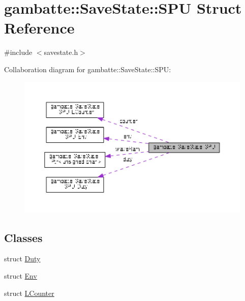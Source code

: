 \hypertarget{structgambatte_1_1SaveState_1_1SPU}{}\section{gambatte\+:\+:Save\+State\+:\+:S\+PU Struct Reference}
\label{structgambatte_1_1SaveState_1_1SPU}


{\ttfamily \#include $<$savestate.\+h$>$}



Collaboration diagram for gambatte\+:\+:Save\+State\+:\+:S\+PU\+:\nopagebreak
\begin{figure}[H]
\begin{center}
\leavevmode
\includegraphics[width=350pt]{structgambatte_1_1SaveState_1_1SPU__coll__graph}
\end{center}
\end{figure}
\subsection*{Classes}
\begin{DoxyCompactItemize}
\item 
struct \hyperlink{structgambatte_1_1SaveState_1_1SPU_1_1Duty}{Duty}
\item 
struct \hyperlink{structgambatte_1_1SaveState_1_1SPU_1_1Env}{Env}
\item 
struct \hyperlink{structgambatte_1_1SaveState_1_1SPU_1_1LCounter}{L\+Counter}
\end{DoxyCompactItemize}
